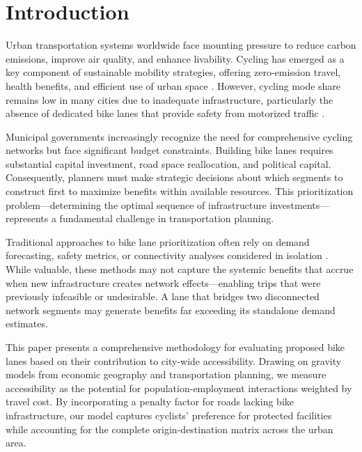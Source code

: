 \documentclass[12pt,a4paper]{article}
\begin{document}
\newpage

\section{Introduction}
\label{sec:introduction}

Urban transportation systems worldwide face mounting pressure to reduce carbon emissions, improve air quality, and enhance livability. Cycling has emerged as a key component of sustainable mobility strategies, offering zero-emission travel, health benefits, and efficient use of urban space \citep{pucher2017cycling}. However, cycling mode share remains low in many cities due to inadequate infrastructure, particularly the absence of dedicated bike lanes that provide safety from motorized traffic \citep{dill2003bicycle}.

Municipal governments increasingly recognize the need for comprehensive cycling networks but face significant budget constraints. Building bike lanes requires substantial capital investment, road space reallocation, and political capital. Consequently, planners must make strategic decisions about which segments to construct first to maximize benefits within available resources. This prioritization problem---determining the optimal sequence of infrastructure investments---represents a fundamental challenge in transportation planning.

Traditional approaches to bike lane prioritization often rely on demand forecasting, safety metrics, or connectivity analyses considered in isolation \citep{larsen2013build}. While valuable, these methods may not capture the systemic benefits that accrue when new infrastructure creates network effects---enabling trips that were previously infeasible or undesirable. A lane that bridges two disconnected network segments may generate benefits far exceeding its standalone demand estimates.

This paper presents a comprehensive methodology for evaluating proposed bike lanes based on their contribution to city-wide accessibility. Drawing on gravity models from economic geography and transportation planning, we measure accessibility as the potential for population-employment interactions weighted by travel cost. By incorporating a penalty factor for roads lacking bike infrastructure, our model captures cyclists' preference for protected facilities while accounting for the complete origin-destination matrix across the urban area.
\end{document}
